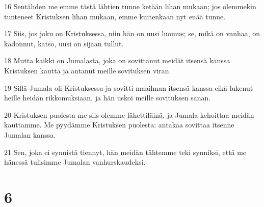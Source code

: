 \par 16 Sentähden me emme tästä lähtien tunne ketään lihan mukaan; jos olemmekin tunteneet Kristuksen lihan mukaan, emme kuitenkaan nyt enää tunne.
\par 17 Siis, jos joku on Kristuksessa, niin hän on uusi luomus; se, mikä on vanhaa, on kadonnut, katso, uusi on sijaan tullut.
\par 18 Mutta kaikki on Jumalasta, joka on sovittanut meidät itsensä kanssa Kristuksen kautta ja antanut meille sovituksen viran.
\par 19 Sillä Jumala oli Kristuksessa ja sovitti maailman itsensä kanssa eikä lukenut heille heidän rikkomuksiaan, ja hän uskoi meille sovituksen sanan.
\par 20 Kristuksen puolesta me siis olemme lähettiläinä, ja Jumala kehoittaa meidän kauttamme. Me pyydämme Kristuksen puolesta: antakaa sovittaa itsenne Jumalan kanssa.
\par 21 Sen, joka ei synnistä tiennyt, hän meidän tähtemme teki synniksi, että me hänessä tulisimme Jumalan vanhurskaudeksi.

\chapter{6}


